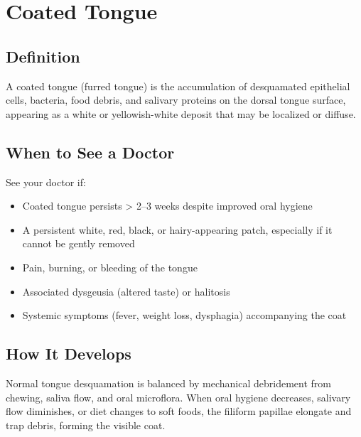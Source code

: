 \chapter{Coated Tongue}

\section*{Definition}
A coated tongue (furred tongue) is the accumulation of desquamated epithelial cells, bacteria, food debris, and salivary proteins on the dorsal tongue surface, appearing as a white or yellowish-white deposit that may be localized or diffuse.

\section*{When to See a Doctor}
See your doctor if:
\begin{itemize}
  \item Coated tongue persists > 2--3 weeks despite improved oral hygiene
  \item A persistent white, red, black, or hairy-appearing patch, especially if it cannot be gently removed
  \item Pain, burning, or bleeding of the tongue
  \item Associated dysgeusia (altered taste) or halitosis
  \item Systemic symptoms (fever, weight loss, dysphagia) accompanying the coat
\end{itemize}

\section*{How It Develops}
Normal tongue desquamation is balanced by mechanical debridement from chewing, saliva flow, and oral microflora. When oral hygiene decreases, salivary flow diminishes, or diet changes to soft foods, the filiform papillae elongate and trap debris, forming the visible coat.

